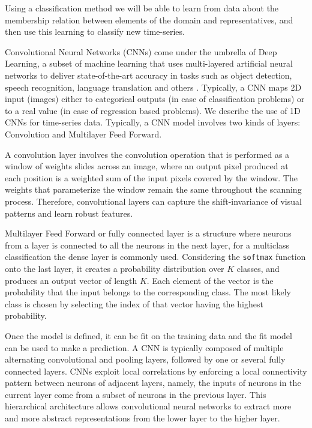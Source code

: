 Using a classification method we will be able to learn from data about the membership relation between elements of the domain and representatives, and then use this learning to classify new time-series. 



Convolutional Neural Networks (CNNs) come under the umbrella of Deep Learning, a subset of machine learning that uses multi-layered artificial neural networks to deliver state-of-the-art accuracy in tasks such as object detection, speech recognition, language translation and others \cite{}. Typically, a CNN maps 2D input (images) either to categorical outputs (in case of classification problems) or to a real value (in case of regression based problems). We describe the use of 1D CNNs for time-series data. Typically, a CNN model involves two kinds of layers: Convolution and Multilayer Feed Forward. 

A convolution layer involves the convolution operation that is performed as a window of weights slides across an image, where an output pixel produced at each position is a weighted sum of the input pixels covered by the window. The weights that parameterize the window remain the same throughout the scanning process. Therefore, convolutional layers can capture the shift-invariance of visual patterns and learn robust features.

Multilayer Feed Forward or fully connected layer is a structure where neurons from a layer is connected to all the neurons in the next layer, for a multiclass classification the dense layer is commonly used. Considering the \texttt{softmax} function onto the last layer, it creates a probability distribution over $K$ classes, and produces an output vector of length $K$. Each element of the vector is the probability that the input belongs to the corresponding class. The most likely class is chosen by selecting the index of that vector having the highest probability.

Once the model is defined, it can be fit on the training data and the fit model can be used to make a prediction. A CNN is typically composed of multiple alternating convolutional and pooling layers, followed by one or several fully connected layers. CNNs exploit local correlations by enforcing a local connectivity pattern between neurons of adjacent layers, namely, the inputs of neurons in the current layer come from a subset of neurons in the previous layer. This hierarchical architecture allows convolutional neural networks to extract more and more abstract representations from the lower layer to the higher layer. 

